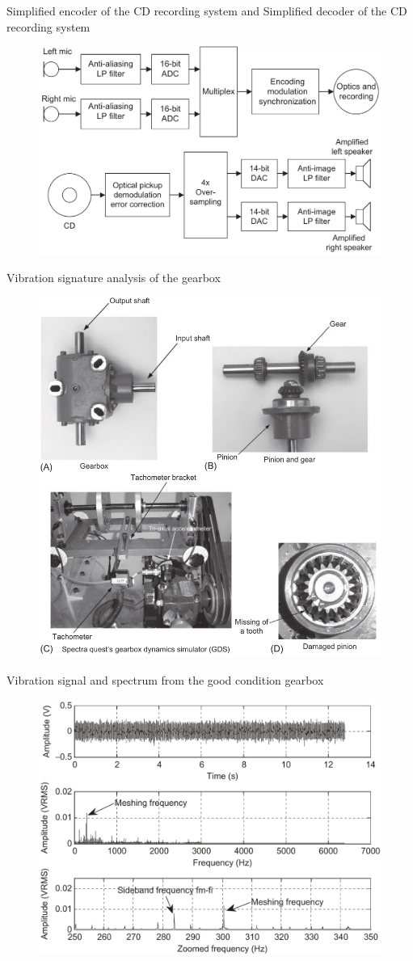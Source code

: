 \documentclass[pdflatex,compress,mathserif]{beamer}
\begin{document}
\begin{frame}{Simplified encoder of the CD recording system and Simplified decoder of the CD recording system}
	\begin{figure}
		\includegraphics[width=0.8\linewidth]{img/img10}
	\end{figure}
\end{frame}

\begin{frame}{Vibration signature analysis of the gearbox}
	\begin{figure}
		\includegraphics[width=0.5\linewidth]{img/img11}
	\end{figure}
\end{frame}

\begin{frame}{Vibration signal and spectrum from the good condition gearbox}
	\begin{figure}
		\includegraphics[width=0.8\linewidth]{img/img12}
	\end{figure}
\end{frame}
\end{document}
